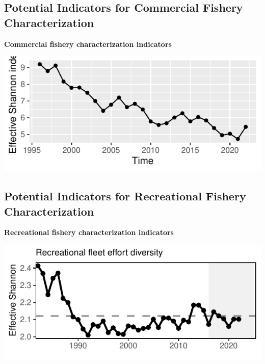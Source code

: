 \documentclass[
  10pt,
]{article}
\let\origfigure\figure
\let\endorigfigure\endfigure
\renewenvironment{figure}[1][2] {
    \expandafter\origfigure\expandafter[H]
} {
    \endorigfigure
}
\begin{document}
\subsection{Potential Indicators for Commercial Fishery Characterization}\label{potential-indicators-for-commercial-fishery-characterization}

\textbf{Commercial fishery characterization indicators}

\begin{figure}

{\centering \includegraphics{NE_RiskPolicy_2025_DRAFT_files/figure-latex/comm-1} 

}

\caption{Effective Shannon index of NE commercial fisheries}\label{fig:comm}
\end{figure}

\subsection{Potential Indicators for Recreational Fishery Characterization}\label{potential-indicators-for-recreational-fishery-characterization}

\textbf{Recreational fishery characterization indicators}

\begin{center}\includegraphics{NE_RiskPolicy_2025_DRAFT_files/figure-latex/rec-1} \end{center}
\end{document}

